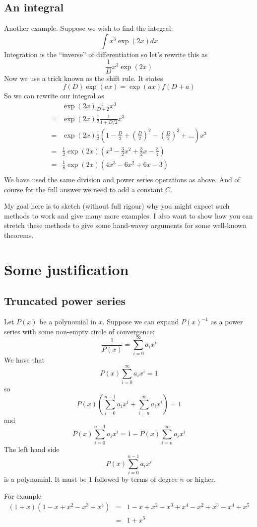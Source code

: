 \documentclass[a4paper]{article}
\theoremstyle{definition}
\begin{document}
\subsection{An integral}
Another example. Suppose we wish to find the integral:
\[
\int x^3\exp(2x) dx
\]
Integration is the ``inverse'' of differentiation so let's rewrite this as
\[
\frac{1}{D}x^3\exp(2x)
\]
Now we use a trick known as the shift rule. It states
\[
f(D)\exp(ax) = \exp(ax)f(D+a)
\]
So we can rewrite our integral as
\begin{eqnarray}
  & \exp(2x)\frac{1}{D+2}x^3 \\
= & \exp(2x)\frac{1}{2}\frac{1}{1+D/2}x^3 \\
= & \exp(2x)\frac{1}{2}(1-\frac{D}{2}+(\frac{D}{2})^2-(\frac{D}{2})^3+\ldots)x^3 \\
= & \frac{1}{2}\exp(2x)(x^3-\frac{3}{2}x^2+\frac{3}{2}x-\frac{3}{4}) \\
= & \frac{1}{8}\exp(2x)(4x^3-6x^2+6x-3) \\
\end{eqnarray}
We have used the same division and power series operations as above.
And of course for the full answer we need to add a constant $C$.

My goal here is to sketch (without full rigour) why you might expect such methods to work and give many more examples.
I also want to show how you can stretch these methods to give some hand-wavey arguments for some well-known theorems.

\section{Some justification}
\subsection{Truncated power series}
Let $P(x)$ be a polynomial in $x$.
Suppose we can expand $P(x)^{-1}$ as a power series with some non-empty circle of convergence:
\[
\frac{1}{P(x)} = \sum_{i=0}^\infty a_ix^i
\]
We have that
\[
P(x)\sum_{i=0}^\infty a_ix^i = 1
\]
so
\[
P(x)(\sum_{i=0}^{n-1} a_ix^i+\sum_{i=n}^\infty a_ix^i) = 1
\]
and
\[
P(x)\sum_{i=0}^{n-1} a_ix^i = 1-P(x)\sum_{i=n}^\infty a_ix^i
\]
The left hand side
\[
P(x)\sum_{i=0}^{n-1} a_ix^i
\]
is a polynomial.
It must be $1$ followed by terms of degree $n$ or higher.

For example
\begin{eqnarray*}
(1+x)(1-x+x^2-x^3+x^4) & = & 1-x+x^2-x^3+x^4-x^2+x^3-x^4+x^5 \\
                       & = & 1+x^5
\end{eqnarray*}
\end{document}
